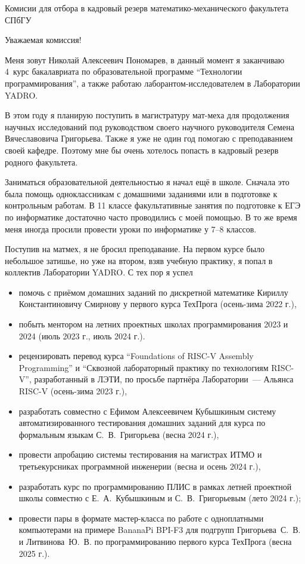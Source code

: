 \documentclass[foldmarks=false, enlargefirstpage=true,
    firstfoot=false, fromphone, fromemail, version=last]{scrlttr2}
\begin{document}
\begin{letter}{Комисии для отбора в кадровый резерв математико-механического факультета СПбГУ}
    \opening{Уважаемая комиссия!}
    Меня зовут Николай Алексеевич Пономарев, в данный момент я заканчиваю 4~курс бакалавриата по образовательной программе \enquote{Технологии программирования}, а также работаю лаборантом-исследователем в Лаборатории YADRO.

    В этом году я планирую поступить в магистратуру мат-меха для продолжения научных исследований под руководством своего научного руководителя Семена Вячеславовича Григорьева.
    Также я уже не один год помогаю с преподаванием своей кафедре.
    Поэтому мне бы очень хотелось попасть в кадровый резерв родного факультета.

    Заниматься образовательной деятельностью я начал ещё в школе.
    Сначала это была помощь одноклассникам с домашними заданиями или в подготовке к контрольным работам.
    В 11 классе факультативные занятия по подготовке к ЕГЭ по информатике достаточно часто проводились с моей помощью.
    В то же время меня иногда просили провести уроки по информатике у 7--8 классов.

    Поступив на матмех, я не бросил преподавание.
    На первом курсе было небольшое затишье, но уже на втором, взяв учебную практику, я попал в коллектив Лаборатории YADRO.
    С тех пор я успел
    \begin{itemize}
        \item помочь с приёмом домашних заданий по дискретной математике Кириллу Константиновичу Смирнову у первого курса ТехПрога (осень-зима 2022 г.),
        \item побыть ментором на летних проектных школах программирования 2023 и 2024 (июль 2023 г., июль 2024 г.).
        \item рецензировать перевод курса \enquote{Foundations of RISC-V Assembly Programming} и \enquote{Сквозной лабораторный практику по технологиям RISC-V}, разработанный в ЛЭТИ, по просьбе партнёра Лаборатории~--- Альянса RISC-V (осень-зима 2023 г.),
        \item разработать совместно с Ефимом Алексеевичем Кубышкиным систему автоматизированного тестирования домашних заданий для курса по формальным языкам С.~В.~Григорьева (весна 2024 г.),
        \item провести апробацию системы тестирования на магистрах ИТМО и третьекурсниках программной инженерии (весна и осень 2024 г.),
        \item разработать курс по программированию ПЛИС в рамках летней проектной школы совместно с Е.~А.~Кубышкиным и С.~В.~Григорьевым (лето 2024 г.);
        \item провести пары в формате мастер-класса по работе с одноплатными компьютерами на примере BananaPi BPI-F3 для подгрупп Григорьева~С.~В. и Литвинова~Ю.~В. по программированию первого курса ТехПрога (весна 2025 г.).
    \end{itemize}


\end{letter}
\end{document}
